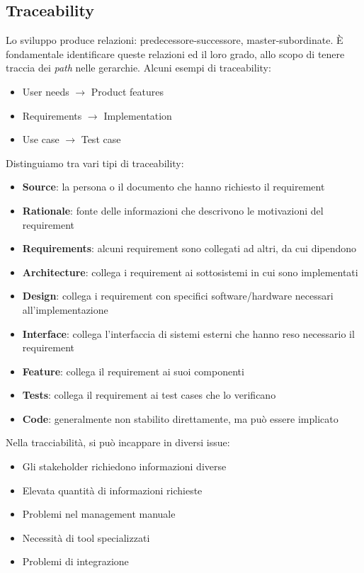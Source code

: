 \documentclass[11pt]{article}
\begin{document}
\subsection{Traceability}
Lo sviluppo produce relazioni: predecessore-successore, master-subordinate. È fondamentale identificare queste relazioni ed il loro grado, allo scopo di tenere traccia dei \textit{path} nelle gerarchie. Alcuni esempi di traceability:
\begin{itemize}
    \item User needs $\rightarrow$ Product features
    \item Requirements $\rightarrow$ Implementation
    \item Use case $\rightarrow$ Test case
\end{itemize}
Distinguiamo tra vari tipi di traceability:
\begin{itemize}
    \item \textbf{Source}: la persona o il documento che hanno richiesto il requirement
    \item \textbf{Rationale}: fonte delle informazioni che descrivono le motivazioni del requirement
    \item \textbf{Requirements}: alcuni requirement sono collegati ad altri, da cui dipendono
    \item \textbf{Architecture}: collega i requirement ai sottosistemi in cui sono implementati
    \item \textbf{Design}: collega i requirement con specifici software/hardware necessari all'implementazione
    \item \textbf{Interface}: collega l'interfaccia di sistemi esterni che hanno reso necessario il requirement
    \item \textbf{Feature}: collega il requirement ai suoi componenti
    \item \textbf{Tests}: collega il requirement ai test cases che lo verificano
    \item \textbf{Code}: generalmente non stabilito direttamente, ma può essere implicato
\end{itemize}
Nella tracciabilità, si può incappare in diversi issue:
\begin{itemize}
    \item Gli stakeholder richiedono informazioni diverse
    \item Elevata quantità di informazioni richieste
    \item Problemi nel management manuale
    \item Necessità di tool specializzati
    \item Problemi di integrazione
\end{itemize}
\end{document}
